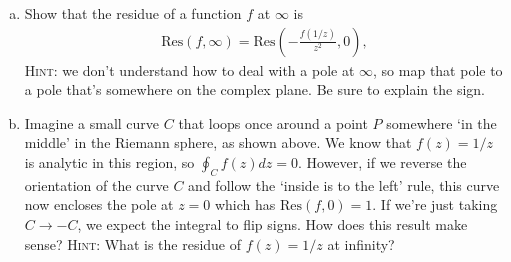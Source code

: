 \documentclass[12pt]{article}
\numberwithin{equation}{section}    %
\begin{document}
\begin{enumerate}[(a)]
\item Show that the residue of a function $f$ at $\infty$ is 
\begin{align}
\text{Res}(f,\infty) = \text{Res}\left(-\frac{f(1/z)}{z^2},0\right),
\end{align}
\textsc{Hint}: we don't understand how to deal with a pole at $\infty$, so map that pole to a pole that's somewhere on the complex plane. Be sure to explain the sign.
\item Imagine a small curve $C$ that loops once around a point $P$ somewhere `in the middle' in the Riemann sphere, as shown above. We know that $f(z)=1/z$ is analytic in this region, so $\oint_C f(z) dz = 0$. However, if we reverse the orientation of the curve $C$ and follow the `inside is to the left' rule, this curve now encloses the pole at $z=0$ which has $\text{Res}(f,0) = 1$. If we're just taking $C \to -C$, we expect the integral to flip signs. How does this result make sense?
\textsc{Hint}: What is the residue of $f(z) = 1/z$ at infinity?
\end{enumerate}
\end{document}
